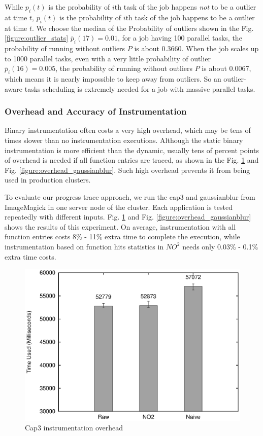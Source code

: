 While $p_i(t)$ is the probability of $i$th task of the job happens \emph{not} to be a
outlier at time $t$, $\overline{p}_i(t)$ is the probability of $i$th task of the job
happens to be a outlier at time $t$. We choose the median of the Probability of outliers
shown in the Fig. \ref{figure:outlier_stats} $\overline{p}_i(17) = 0.01$, for a job having
100 parallel tasks, the probability of running without outliers $P$ is about 0.3660. When
the job scales up to 1000 parallel tasks, even with a very little probability of outlier
$\overline{p}_i(16) = 0.005$, the probability of running without outliers $P$ is about
0.0067, which means it is nearly impossible to keep away from outliers. So an
outlier-aware tasks scheduling is extremely needed for a job with massive parallel tasks.

\subsubsection{Overhead and Accuracy of Instrumentation}

Binary instrumentation often costs a very high overhead, which may be tens of times slower
than no instrumentation executions. Although the static binary instrumentation is more
efficient than the dynamic, usually tens of percent points of overhead is needed if
all function entries are traced, as shown in the Fig. \ref{figure:overhead_cap3} and
Fig. \ref{figure:overhead_gaussianblur}. Such high overhead prevents it from being used in production clusters.

To evaluate our progress trace approach, we run the cap3 and gaussianblur from ImageMagick
in one server node of the cluster. Each application is tested repeatedly with different
inputs. Fig. \ref{figure:overhead_cap3} and Fig. \ref{figure:overhead_gaussianblur} shows
the results of this experiment. On average, instrumentation with all function entries
costs 8\% - 11\% extra time to complete the execution, while instrumentation based on
function hits statistics in $NO^2$ needs only 0.03\% - 0.1\% extra time costs.

\begin{figure}
\centering
  \includegraphics[width=0.9\columnwidth]{figures/overhead_cap3.eps}
\caption{Cap3 instrumentation overhead}
\label{figure:overhead_cap3}
\end{figure}

